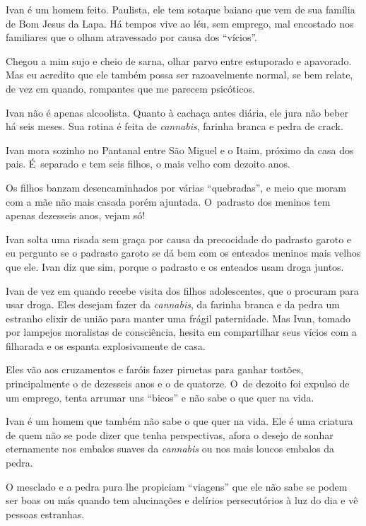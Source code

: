  

Ivan é um homem feito. Paulista, ele tem sotaque baiano que vem de sua
família de Bom Jesus da Lapa. Há tempos vive ao léu, sem emprego, mal
encostado nos familiares que o olham atravessado por causa dos
``vícios''.

Chegou a mim sujo e cheio de sarna, olhar parvo entre estuporado e
apavorado. Mas eu acredito que ele também possa ser razoavelmente
normal, se bem relate, de vez em quando, rompantes que me parecem
psicóticos.

Ivan não é apenas alcoolista. Quanto à cachaça antes diária, ele jura
não beber há seis meses. Sua rotina é feita de \emph{cannabis}, farinha
branca e pedra de crack.

\asterisc{}

Ivan mora sozinho no Pantanal entre São Miguel e o Itaim, próximo da
casa dos pais. É~separado e tem seis filhos, o mais velho com dezoito
anos.

Os filhos banzam desencaminhados por várias ``quebradas'', e meio que
moram com a mãe não mais casada porém ajuntada. O~padrasto dos meninos
tem apenas dezesseis anos, vejam só!

Ivan solta uma risada sem graça por causa da precocidade do padrasto
garoto e eu pergunto se o padrasto garoto se dá bem com os enteados
meninos mais velhos que ele. Ivan diz que sim, porque o padrasto e os
enteados usam droga juntos.

\asterisc{}

Ivan de vez em quando recebe visita dos filhos adolescentes, que o
procuram para usar droga. Eles desejam fazer da \emph{cannabis}, da
farinha branca e da pedra um estranho elixir de união para manter uma
frágil paternidade. Mas Ivan, tomado por lampejos moralistas de
consciência, hesita em compartilhar seus vícios com a filharada e os
espanta explosivamente de casa.

Eles vão aos cruzamentos e faróis fazer piruetas para ganhar tostões,
principalmente o de dezesseis anos e o de quatorze. O~de dezoito foi
expulso de um emprego, tenta arrumar uns ``bicos'' e não sabe o que quer
na vida.

\asterisc{}

Ivan é um homem que também não sabe o que quer na vida. Ele é uma
criatura de quem não se pode dizer que tenha perspectivas, afora o
desejo de sonhar eternamente nos embalos suaves da \emph{cannabis} ou
nos mais loucos embalos da pedra.

O mesclado e a pedra pura lhe propiciam ``viagens'' que ele não sabe se
podem ser boas ou más quando tem alucinações e delírios
persecutórios à luz do dia e vê pessoas estranhas.

